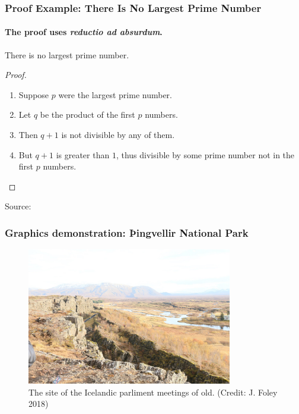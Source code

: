 \documentclass[aspectratio=169]{rubeamer}
\begin{document}
\begin{frame}
  \frametitle{Proof Example: There Is No Largest Prime Number}
  \framesubtitle{The proof uses \textit{reductio ad absurdum}.}
  \begin{theorem}
    There is no largest prime number.
  \end{theorem}
  \begin{proof}
    \begin{enumerate}
    \item<1-| alert@1> Suppose $p$ were the largest prime number.
    \item<2-> Let $q$ be the product of the first $p$ numbers.
    \item<3-> Then $q+1$ is not divisible by any of them.
    \item<1-> But $q + 1$ is greater than $1$, thus divisible by some prime
      number not in the first $p$ numbers.\qedhere
    \end{enumerate}
  \end{proof}
  Source: \cite{wright2017beamer}
\end{frame}


\begin{frame}
  \frametitle{Graphics demonstration: Þingvellir National Park}
  \begin{figure}
    \centering
    \includegraphics[height=0.8\textheight,width=0.8\textwidth,keepaspectratio]{thingvellir}
    \caption{The site of the Icelandic parliment meetings of old.  (Credit: J. Foley 2018)}
    \label{fig:thingvellir}
  \end{figure}
\end{frame}
\end{document}
